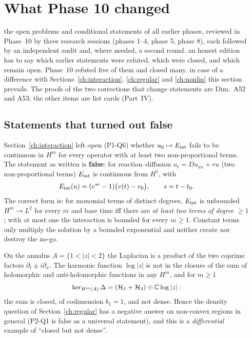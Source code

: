 \section{What Phase 10 changed}\label{ch:phase10}
\sectionbrief
{the open problems and conditional statements of all earlier phases, reviewed in Phase~10 by three research sessions (phases 1--4, phase 5, phase 8), each followed by an independent audit and, where needed, a second round.}
{an honest edition has to say which earlier statements were refuted, which were closed, and which remain open. Phase~10 refuted five of them and closed many.}
{in case of a difference with Sections~\ref{ch:interaction}, \ref{ch:regular} and \ref{ch:nonlin} this section prevails. The proofs of the two corrections that change statements are Dim.~A52 and A53; the other items are list cards (Part~IV).}

\subsection{Statements that turned out false}

\begin{proposition}\label{thm:s10at1}
Section~\ref{ch:interaction} left open (P1-Q6) whether $u_0\mapsto E_{\rm int}$ fails to be continuous in $H^m$ for every operator with at least two non-proportional terms. The statement as written is \textbf{false}: for reaction--diffusion $u_t=Du_{xx}+ru$ (two non-proportional terms) $E_{\rm int}$ is continuous from $H^1$, with
\[
E_{\rm int}(u)=(e^{sr}-1)\big(v(t)-v_0\big),\qquad s=t-t_0 .
\]
The correct form is: for monomial terms of distinct degrees, $E_{\rm int}$ is unbounded $H^m\to L^2$ for every $m$ and base time iff there are \emph{at least two terms of degree $\ge1$}; with at most one the interaction is bounded for every $m\ge1$. Constant terms only multiply the solution by a bounded exponential and neither create nor destroy the no-go.
\end{proposition}

\begin{proposition}\label{prop:s10ap1}
On the annulus $A=\{1<|z|<2\}$ the Laplacian is a product of the two coprime factors $\partial_t\pm i\partial_x$. The harmonic function $\log|z|$ is not in the closure of the sum of holomorphic and anti-holomorphic functions in any $H^m$, and for $m\ge1$
\[
\ker_{H^m(A)}\Delta=(\mathcal H_1+\mathcal H_2)\oplus\mathbb{C}\log|z| :
\]
the sum is closed, of codimension $b_1=1$, and not dense. Hence the density question of Section~\ref{ch:regular} has a negative answer on non-convex regions in general (P2-Q1 is false as a universal statement), and this is a \emph{differential} example of ``closed but not dense''.
\end{proposition}

